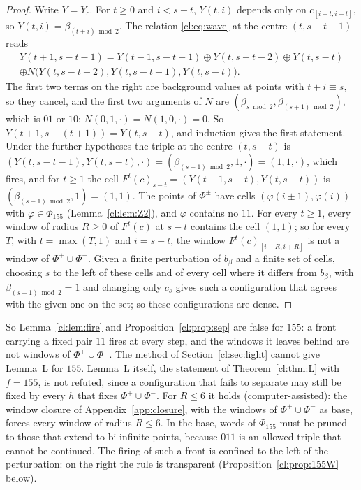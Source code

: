 \begin{proof}
Write $Y=Y_c$. For $t\ge0$ and $i<s-t$, $Y(t,i)$ depends only on $c_{[i-t,i+t]}$, so $Y(t,i)=\beta_{(t+i)\bmod2}$. The relation \eqref{cl:eq:wave} at the centre $(t,s-t-1)$ reads
\begin{multline*}
Y(t+1,s-t-1)=Y(t-1,s-t-1)\oplus Y(t,s-t-2)\oplus Y(t,s-t)\\
\oplus N\bigl(Y(t,s-t-2),Y(t,s-t-1),Y(t,s-t)\bigr).
\end{multline*}
The first two terms on the right are background values at points with $t+i\equiv s$, so they cancel, and the first two arguments of $N$ are $(\beta_{s\bmod2},\beta_{(s+1)\bmod2})$, which is $01$ or $10$; $N(0,1,\cdot)=N(1,0,\cdot)=0$. So $Y(t+1,s-(t+1))=Y(t,s-t)$, and induction gives the first statement. Under the further hypotheses the triple at the centre $(t,s-t)$ is $(Y(t,s-t-1),Y(t,s-t),\cdot)=(\beta_{(s-1)\bmod2},1,\cdot)=(1,1,\cdot)$, which fires, and for $t\ge1$ the cell $F^t(c)_{s-t}=(Y(t-1,s-t),Y(t,s-t))$ is $(\beta_{(s-1)\bmod2},1)=(1,1)$. The points of $\Phi^\pm$ have cells $(\varphi(i\pm1),\varphi(i))$ with $\varphi\in\Phi_{155}$ (Lemma~\ref{cl:lem:Z2}), and $\varphi$ contains no $11$. For every $t\ge1$, every window of radius $R\ge0$ of $F^t(c)$ at $s-t$ contains the cell $(1,1)$; so for every $T$, with $t=\max(T,1)$ and $i=s-t$, the window $F^t(c)_{[i-R,i+R]}$ is not a window of $\Phi^+\cup\Phi^-$. Given a finite perturbation of $b_\beta$ and a finite set of cells, choosing $s$ to the left of these cells and of every cell where it differs from $b_\beta$, with $\beta_{(s-1)\bmod2}=1$ and changing only $c_s$ gives such a configuration that agrees with the given one on the set; so these configurations are dense.
\end{proof}

\begin{remark}[$155$R]\label{cl:rem:155}
So Lemma~\ref{cl:lem:fire} and Proposition~\ref{cl:prop:sep} are false for $155$: a front carrying a fixed pair $11$ fires at every step, and the windows it leaves behind are not windows of $\Phi^+\cup\Phi^-$. The method of Section~\ref{cl:sec:light} cannot give Lemma~L for $155$. Lemma~L itself, the statement of Theorem~\ref{cl:thm:L} with $f=155$, is not refuted, since a configuration that fails to separate may still be fixed by every $h$ that fixes $\Phi^+\cup\Phi^-$. For $R\le6$ it holds (computer-assisted): the window closure of Appendix~\ref{app:closure}, with the windows of $\Phi^+\cup\Phi^-$ as base, forces every window of radius $R\le6$. In the base, words of $\Phi_{155}$ must be pruned to those that extend to bi-infinite points, because $011$ is an allowed triple that cannot be continued. The firing of such a front is confined to the left of the perturbation: on the right the rule is transparent (Proposition~\ref{cl:prop:155W} below).
\end{remark}

